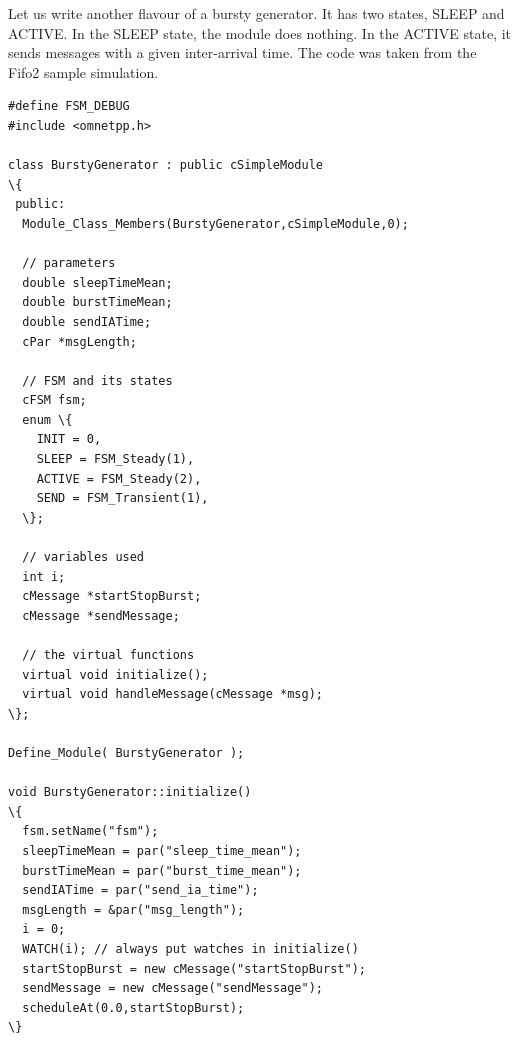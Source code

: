 Let us write another flavour of a bursty generator. It has two
states, SLEEP and ACTIVE. In the SLEEP state, the module does
nothing. In the ACTIVE state, it sends messages with a given
inter-arrival time. The code was taken from the Fifo2 sample
simulation.


\begin{Verbatim}[commandchars=\\\{\}]
#define FSM_DEBUG
#include <omnetpp.h>

class BurstyGenerator : public cSimpleModule
\{
 public:
  Module_Class_Members(BurstyGenerator,cSimpleModule,0);

  // parameters
  double sleepTimeMean;
  double burstTimeMean;
  double sendIATime;
  cPar *msgLength;

  // FSM and its states
  cFSM fsm;
  enum \{
    INIT = 0,
    SLEEP = FSM_Steady(1),
    ACTIVE = FSM_Steady(2),
    SEND = FSM_Transient(1),
  \};

  // variables used
  int i;
  cMessage *startStopBurst;
  cMessage *sendMessage;

  // the virtual functions
  virtual void initialize();
  virtual void handleMessage(cMessage *msg);
\};

Define_Module( BurstyGenerator );

void BurstyGenerator::initialize()
\{
  fsm.setName("fsm");
  sleepTimeMean = par("sleep_time_mean");
  burstTimeMean = par("burst_time_mean");
  sendIATime = par("send_ia_time");
  msgLength = &par("msg_length");
  i = 0;
  WATCH(i); // always put watches in initialize()
  startStopBurst = new cMessage("startStopBurst");
  sendMessage = new cMessage("sendMessage");
  scheduleAt(0.0,startStopBurst);
\}


\end{Verbatim}
